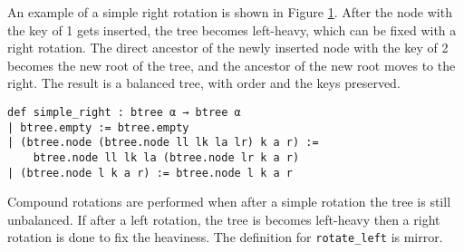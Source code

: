 \begin{figure}[!ht]
  \begin{subfigure}[c]{0.3\textwidth}
    \centering
  \end{subfigure}%
  \begin{subfigure}{0.3\textwidth}
    \centering
  \end{subfigure}%
  \begin{subfigure}[c]{0.3\textwidth}
    \centering
  \end{subfigure}
  \caption{}
  \label{fig:rotation}
\end{figure}

An example of a simple right rotation is shown in Figure \ref{fig:rotation}. After the node with the key of 1 gets inserted, the tree becomes left-heavy, which can be fixed with a right rotation. The direct ancestor of the newly inserted node with the key of 2 becomes the new root of the tree, and the ancestor of the new root moves to the right. The result is a balanced tree, with order and the keys preserved.

\begin{lstlisting}
def simple_right : btree α → btree α
| btree.empty := btree.empty
| (btree.node (btree.node ll lk la lr) k a r) := 
    btree.node ll lk la (btree.node lr k a r)
| (btree.node l k a r) := btree.node l k a r
\end{lstlisting}

Compound rotations are performed when after a simple rotation the tree is still unbalanced. If after a left rotation, the tree is becomes left-heavy then a right rotation is done to fix the heaviness. The definition for \lstinline{rotate_left} is mirror. 

